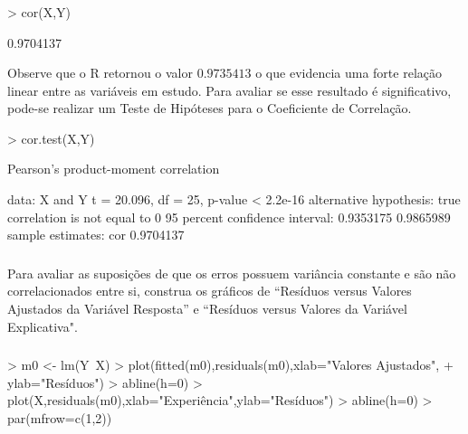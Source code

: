 \documentclass[14pt,aspectratio=1610]{beamer}
\begin{document}
\begin{frame}[fragile]{}
\frametitle{ }
\begin{block}{}


\begin{Schunk}
\begin{Sinput}
> cor(X,Y)
\end{Sinput}
\begin{Soutput}
[1] 0.9704137
\end{Soutput}
\end{Schunk}

Observe que o R retornou o valor $0.9735413$ o que evidencia uma forte relação linear entre as variáveis em estudo. Para avaliar se esse resultado é significativo, pode-se realizar um Teste de Hipóteses para o Coeficiente de Correlação.

\begin{Schunk}
\begin{Sinput}
> cor.test(X,Y)
\end{Sinput}
\begin{Soutput}
	Pearson's product-moment correlation

data:  X and Y
t = 20.096, df = 25, p-value < 2.2e-16
alternative hypothesis: true correlation is not equal to 0
95 percent confidence interval:
 0.9353175 0.9865989
sample estimates:
      cor 
0.9704137 
\end{Soutput}
\end{Schunk}
\end{block}
\end{frame}

\begin{frame}[fragile]{}
\frametitle{}
\begin{block}{}
\justifying
Para avaliar as suposições de que os erros possuem variância constante e são não correlacionados entre si, construa os gráficos de “Resíduos versus Valores Ajustados da Variável Resposta” e “Resíduos versus Valores da Variável Explicativa".
\end{block}
\end{frame}

\begin{frame}[fragile]{}
\frametitle{ }
\begin{block}{}
\justifying

\begin{Schunk}
\begin{Sinput}
> m0 <- lm(Y~X)
> plot(fitted(m0),residuals(m0),xlab="Valores Ajustados",
+      ylab="Resíduos")
> abline(h=0)
> plot(X,residuals(m0),xlab="Experiência",ylab="Resíduos")
> abline(h=0)
> par(mfrow=c(1,2))
\end{Sinput}
\end{Schunk}
\end{block}

\end{frame}
\end{document}
